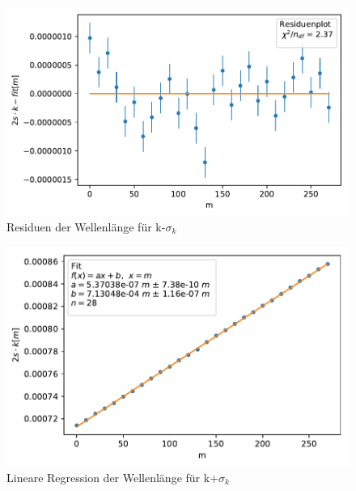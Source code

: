 \documentclass[12pt,a4paper]{article}
\begin{document}
\begin{figure}[H]
	\centering
	\includegraphics[scale=1.0]{Python/Lambdagruen_Residuen2.pdf}
	\caption{Residuen der Wellenlänge für k-$\sigma_k$}
\end{figure}

\begin{figure}[H]
	\centering
	\includegraphics[scale=1.0]{Python/Lambdagruen_LinReg3.pdf}
	\caption{Lineare Regression der Wellenlänge für k+$\sigma_k$}
\end{figure}
\end{document}
